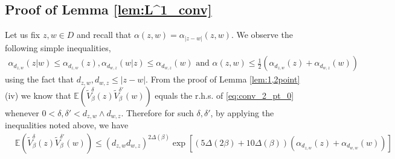 \documentclass[a4paper, 11pt, reqno]{amsart}
\theoremstyle{definition} \newtheorem{defn}{Definition}[section]
\theoremstyle{remark} \newtheorem{rem}[defn]{Remark}
\theoremstyle{remark} \newtheorem*{rem*}{Remark}
\theoremstyle{plain} \newtheorem{thm}[defn]{Theorem}
\theoremstyle{plain} \newtheorem{lem}[defn]{Lemma}
\theoremstyle{plain} \newtheorem{prop}[defn]{Proposition}
\theoremstyle{plain} \newtheorem{cor}[defn]{Corollary}
\theoremstyle{remark} \newtheorem{exm}[defn]{\textbf{Example}}
\theoremstyle{remark} \newtheorem{exms}[defn]{\textbf{Examples}}
\theoremstyle{remark} \newtheorem*{bl}{}
\numberwithin{equation}{section} %
\newcommand{\R}{\mathbb{R}}
\newcommand{\E}{\mathbb{E}}
\begin{document}
    \subsection{Proof of Lemma \ref{lem:L^1_conv}}\label{app:proof_lem:L^1_conv}

    Let us fix $z, w \in D$ and recall that $\alpha(z,w) = \alpha_{|z-w|}(z,w)$. We observe the following simple inequalities, 
		\begin{align}\label{eq:2point_bounds}
			\alpha_{d_{z,w}}(z|w) \le \alpha_{d_{z,w}}(z),
			\alpha_{d_{w,z}}(w|z) \le \alpha_{d_{w,z}}(w)  \text{ and }
            \alpha(z,w) \le 
            \frac{1}{2}(\alpha_{d_{z,w}}(z) + \alpha_{d_{w,z}}(w))
		\end{align}
		using the fact that $d_{z,w}, d_{w,z} \le |z-w|$. 
		From the proof of Lemma \ref{lem:1,2point}(iv) we know that $\E ( \tilde{V}^{\delta}_{\beta}(z) \tilde{V}^{\delta'}_{\beta}(w))$ equals the r.h.s. of \eqref{eq:conv_2_pt_0} whenever $0< \delta, \delta' < d_{z,w} \wedge d_{w,z}$. Therefore for such $\delta, \delta'$, by applying the inequalities noted above, we have 
		\begin{align}\label{eq:L^1_2}
			& \E ( \tilde{V}^{\delta}_{\beta}(z) \tilde{V}^{\delta'}_{\beta}(w))
			\le (d_{z,w}d_{w,z})^{2 \Delta(\beta)} \exp[ (5\Delta(2\beta) + 10\Delta(\beta))(\alpha_{d_{z,w}}(z) + \alpha_{d_{w,w}}(w))] 
		\end{align}
\end{document}
